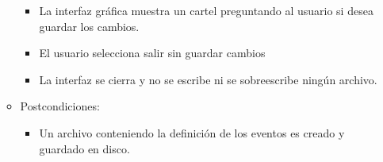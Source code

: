 \begin{itemize}
\begin{itemize}
\begin{itemize}
	    	    \item La interfaz gráfica muestra un cartel preguntando al usuario si
	    	    desea guardar los cambios.
	    	    \item El usuario selecciona salir sin guardar cambios
	    	    \item La interfaz se cierra y no se escribe ni se sobreescribe ningún
	    	    archivo.
	    	\end{itemize}
	    \item Postcondiciones:
	    	\begin{itemize}
	       	    \item Un archivo conteniendo la definición de los eventos es
	       	    creado y guardado en disco.
	       	\end{itemize}
    \end{itemize}
    

\end{itemize}
